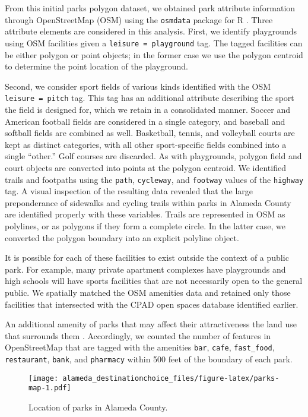 \documentclass[3p, authoryear, review]{elsarticle} %
\begin{document}
From this initial parks polygon dataset, we obtained park attribute information
through OpenStreetMap (OSM) using the \texttt{osmdata} package for R \citep{osmdata}. Three
attribute elements are considered in this analysis. First, we identify
playgrounds using OSM facilities given a \texttt{leisure\ =\ playground} tag. The tagged
facilities can be either polygon or point objects; in the former case we use the
polygon centroid to determine the point location of the playground.

Second, we consider sport fields of various kinds identified with the OSM
\texttt{leisure\ =\ pitch} tag. This tag has an additional attribute describing the sport
the field is designed for, which we retain in a consolidated manner. Soccer and
American football fields are considered in a single category, and baseball and
softball fields are combined as well. Basketball, tennis, and volleyball courts
are kept as distinct categories, with all other sport-specific fields combined
into a single ``other.'' Golf courses are discarded. As with playgrounds, polygon
field and court objects are converted into points at the polygon centroid.
We identified trails and footpaths using the \texttt{path}, \texttt{cycleway}, and
\texttt{footway} values of the \texttt{highway} tag. A visual inspection of the resulting data
revealed that the large preponderance of sidewalks and cycling trails within
parks in Alameda County are identified properly with these variables. Trails are
represented in OSM as polylines, or as polygons if they form a complete circle.
In the latter case, we converted the polygon boundary into an explicit polyline
object.

It is possible for each of these facilities to exist outside the context of a
public park. For example, many private apartment complexes have playgrounds and
high schools will have sports facilities that are not necessarily open to the
general public. We spatially matched the OSM amenities data and retained only
those facilities that intersected with the CPAD open spaces database identified
earlier.

An additional amenity of parks that may affect their attractiveness the land use
that surrounds them \citep{clifton2016}. Accordingly, we counted the number of features
in OpenStreetMap that are tagged with the amenities \texttt{bar}, \texttt{cafe}, \texttt{fast\_food},
\texttt{restaurant}, \texttt{bank}, and \texttt{pharmacy} within 500 feet of the boundary of each park.

\begin{figure}
\centering
\texttt{[image: alameda\_destinationchoice\_files/figure-latex/parks-map-1.pdf]}
\caption{\label{fig:parks-map}Location of parks in Alameda County.}
\end{figure}
\end{document}
